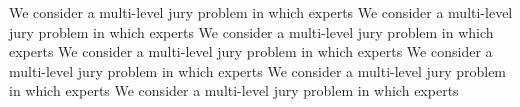 \documentclass[letterpaper]{article} %
\begin{document}
We consider a multi-level jury problem in which experts
We consider a multi-level jury problem in which experts
We consider a multi-level jury problem in which experts
We consider a multi-level jury problem in which experts
We consider a multi-level jury problem in which experts
We consider a multi-level jury problem in which experts
We consider a multi-level jury problem in which experts
\clearpage


\end{document}
